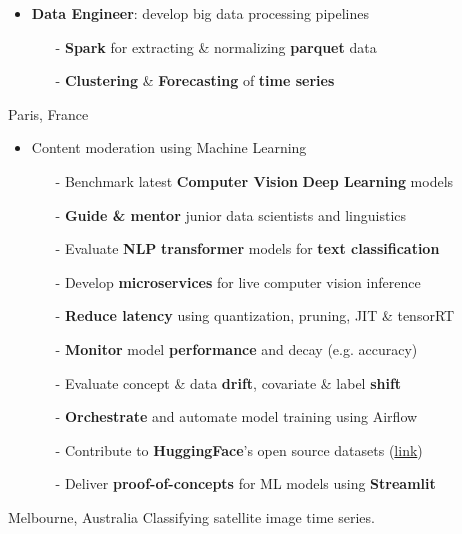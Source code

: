\documentclass[10pt,a4paper,ragged2e]{altacv}
\begin{document}
\begin{itemize}
	\item \textbf{Data Engineer}: develop big data processing pipelines 
	\vspace{0.3em}
	\begin{itemize}
		\item[-] \textbf{Spark} for extracting \& normalizing \textbf{parquet} data
		\item[-] \textbf{Clustering} \& \textbf{Forecasting} of \textbf{time series} 
	\end{itemize}
	
\end{itemize}

\divider

     {Paris, France}
\begin{itemize}
	\item  Content moderation using Machine Learning
	\vspace{0.5em}
	\begin{itemize}
		\item[-] Benchmark latest \textbf{Computer Vision} \textbf{Deep Learning} models
		\item[-] \textbf{Guide \& mentor} junior data scientists and linguistics
		\item[-] Evaluate \textbf{NLP} \textbf{transformer} models for \textbf{text classification}  
		\item[-] Develop \textbf{microservices} for live computer vision inference 
		\item[-] \textbf{Reduce latency} using quantization, pruning, JIT \& tensorRT
		\item[-] \textbf{Monitor} model \textbf{performance} and decay (e.g. accuracy)
		\item[-] Evaluate concept \& data \textbf{drift}, covariate \& label \textbf{shift}
		\item[-] \textbf{Orchestrate} and automate model training using Airflow 
		\item[-] Contribute to \textbf{HuggingFace}'s open source datasets (\href{https://github.com/pulls?q=is%3Apr+author%3Ahfawaz+archived%3Afalse+is%3Aclosed+huggingface+is%3Amerged}{link})
		\item[-] Deliver \textbf{proof-of-concepts} for ML models using \textbf{Streamlit}
	\end{itemize}
\end{itemize}

\divider


     {Melbourne, Australia}
{Classifying satellite image time series.}\\
\divider
\end{document}
